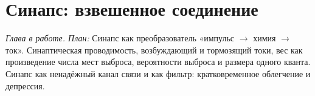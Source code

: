 \chapter{Синапс: взвешенное соединение}
\label{sec:synapse}

\emph{Глава в работе. План:} Синапс как преобразователь «импульс $\to$ химия $\to$ ток». Синаптическая проводимость, возбуждающий и тормозящий токи, вес как произведение числа мест выброса, вероятности выброса и размера одного кванта. Синапс как ненадёжный канал связи и как фильтр: кратковременное облегчение и депрессия.
